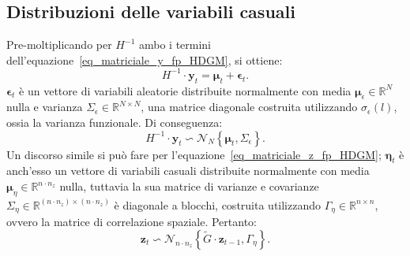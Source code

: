 \subsection[Distribuzioni delle variabili casuali]{Distribuzioni delle variabili casuali}
Pre-moltiplicando per $H^{-1}$ ambo i termini dell'equazione~\ref{eq_matriciale_y_fp_HDGM}, si ottiene:
\[
H^{-1}\cdot\mathbf{y}_t  = \boldsymbol{\mu}_t + \boldsymbol{\epsilon}_t.
\]
$\boldsymbol{\epsilon}_t$ è un vettore di variabili aleatorie distribuite normalmente con media $\boldsymbol{\mu}_\epsilon\in\mathbb{R}^{N}$ nulla e varianza $\Sigma_\epsilon\in\mathbb{R}^{N\times N}$, una matrice diagonale costruita utilizzando $\sigma_\epsilon(l)$, ossia la varianza funzionale. Di conseguenza:
\[
H^{-1}\cdot\mathbf{y}_t\backsim\mathcal{N}_N\left\{\boldsymbol{\mu}_t, \Sigma_\epsilon\right\}.
\]
Un discorso simile si può fare per l'equazione~\ref{eq_matriciale_z_fp_HDGM}; $\boldsymbol{\eta}_t$ è anch'esso un vettore di variabili casuali distribuite normalmente con media $\boldsymbol{\mu}_\eta\in\mathbb{R}^{n\cdot n_z}$ nulla, tuttavia la sua matrice di varianze e covarianze $\Sigma_\eta\in\mathbb{R}^{(n\cdot n_z)\times(n\cdot n_z)}$ è diagonale a blocchi, costruita utilizzando $\Gamma_\eta\in\mathbb{R}^{n\times n}$, ovvero la matrice di correlazione spaziale. Pertanto:
\[
\mathbf{z}_t\backsim\mathcal{N}_{n\cdot n_z}\left\{\tilde{G}\cdot\mathbf{z}_{t-1}, \Gamma_\eta\right\}.
\]

